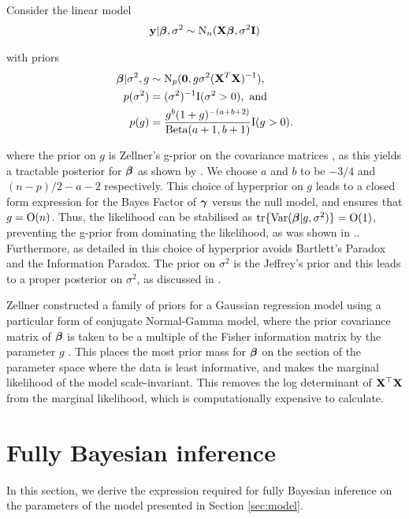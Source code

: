 \documentclass{amsart}[12pt]
\begin{document}
Consider the linear model
\begin{align*}
	{\bf y} | {\boldsymbol \beta}, \sigma^2 \sim \text{N}_n({\bf X} {\boldsymbol \beta}, \sigma^2 {\bf I}) 
\end{align*}

\noindent with priors
\begin{align*}
	{\boldsymbol\beta} | \sigma^2, g & \sim \text{N}_p({\bf 0}, g \sigma^2 ({\bf X}^T {\bf X})^{-1}),                     \\
	p(\sigma^2)          & = (\sigma^2)^{-1} \text{I}(\sigma^2 > 0), \text{ and }                    \\
	p(g)                 & = \frac{g^b (1 + g)^{-(a + b + 2)}}{\text{Beta}(a + 1, b + 1)} \text{I}(g > 0). 
\end{align*}

\noindent where the prior on $g$ is Zellner's g-prior on the covariance matrices \citep{Goel1986}, as this
yields a tractable posterior for ${\boldsymbol \beta}$ as shown by \citep{Liang2008}. We choose $a$  and $b$ to be $-3/4$
and $(n - p)/2 - a - 2$ respectively. This choice of hyperprior on $g$ leads to a closed form expression for
the Bayes Factor of ${\boldsymbol \gamma}$ versus the null model, and ensures that $g = \text{O}(n)$. Thus, the likelihood can
be stabilised as $\text{tr}\{\text{Var}({\boldsymbol \beta} | g, \sigma^2)\} = \text{O}(1)$, preventing the g-prior from dominating the
likelihood, as was shown in \citep{Maruyama2011}.. Furthermore, as detailed in \citep{Liang2008} this choice
of hyperprior avoids Bartlett's Paradox and the Information Paradox. The prior on $\sigma^2$ is the Jeffrey's
prior and this leads to a proper posterior on $\sigma^2$, as discussed in \citep{Berger2012}.

Zellner constructed a family of priors for a Gaussian regression model using a particular form of conjugate
Normal-Gamma model, where the prior covariance matrix of ${\boldsymbol \beta}$ is taken to be a multiple of the Fisher
information  matrix by the parameter $g$ \citep{Goel1986}. This places the most prior mass for ${\boldsymbol \beta}$ on the
section of the parameter space where the data is least informative, and makes the marginal likelihood of the
model scale-invariant. This removes the log determinant of ${\bf X}^\top {\bf X}$ from the marginal likelihood, which
is computationally expensive to calculate.

\section{Fully Bayesian inference}
\label{sec:full_bayes}

In this section, we derive the expression required for fully Bayesian inference on the parameters of the model
presented in Section \ref{sec:model}.
\end{document}
